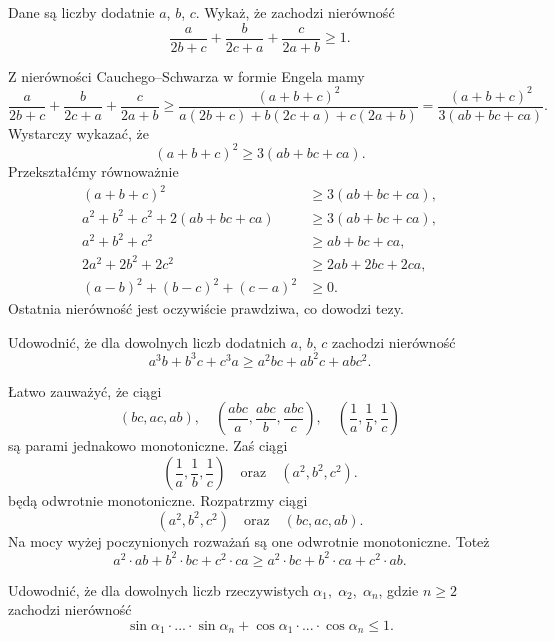 \newpage
{}

\begin{problem}{1}
	Dane są liczby dodatnie $a$, $b$, $c$. Wykaż, że zachodzi nierówność
	\[
		\frac{a}{2b + c} + \frac{b}{2c + a} + \frac{c}{2a + b} \geqslant 1. 
	\]
\end{problem}

\noindent
Z nierówności Cauchego–Schwarza w formie Engela mamy
\[
	\frac{a}{2b + c} + \frac{b}{2c + a} + \frac{c}{2a + b} \geqslant \frac{(a + b + c)^2}{a(2b + c) + b(2c + a) + c(2a + b)} = \frac{(a + b + c)^2}{3(ab + bc + ca)}.
\]
Wystarczy wykazać, że
\[
	(a + b + c)^2 \geqslant 3(ab + bc + ca).
\]
Przekształćmy równoważnie
\begin{align*}
	(a + b + c)^2 &\geqslant 3(ab + bc + ca), \\ 
	a^2 + b^2 + c^2 + 2(ab + bc + ca) &\geqslant 3(ab + bc + ca), \\
	a^2 + b^2 + c^2 &\geqslant ab + bc + ca, \\
	2a^2 + 2b^2 + 2c^2 &\geqslant 2ab + 2bc + 2ca, \\
	(a - b)^2 + (b - c)^2 + (c - a)^2 &\geqslant 0.
\end{align*}
Ostatnia nierówność jest oczywiście prawdziwa, co dowodzi tezy.

\begin{problem}{2}
	Udowodnić, że dla dowolnych liczb dodatnich $a$, $b$, $c$ zachodzi nierówność
	\[
		a^3b + b^3c + c^3a \geqslant a^2bc + ab^2c + abc^2.
	\]
\end{problem}

\noindent
Łatwo zauważyć, że ciągi
\[
	(bc, ac, ab), \quad \left(\frac{abc}{a}, \frac{abc}{b}, \frac{abc}{c}\right), \quad \left(\frac{1}{a}, \frac{1}{b}, \frac{1}{c}\right)
\]
są parami jednakowo monotoniczne. Zaś ciągi
\[
	\left(\frac{1}{a}, \frac{1}{b}, \frac{1}{c}\right) \quad \text{oraz} \quad (a^2, b^2, c^2).
\]
będą odwrotnie monotoniczne.
Rozpatrzmy ciągi
\[
	(a^2, b^2, c^2) \quad \text{oraz} \quad (bc, ac, ab).
\]
Na mocy wyżej poczynionych rozważań są one odwrotnie monotoniczne. Toteż
\[
	a^2 \cdot ab  + b^2 \cdot bc  + c^2 \cdot ca  \geqslant a^2 \cdot bc  + b^2 \cdot ca  + c^2 \cdot ab.
\]

\begin{problem}{3}
	Udowodnić, że dla dowolnych liczb rzeczywistych $\alpha_1, \; \alpha_2, \; \alpha_n$, gdzie $n \geqslant 2$ zachodzi nierówność
	\[
		\sin{\alpha_1}\cdot ... \cdot \sin{\alpha_n} + \cos{\alpha_1}\cdot ... \cdot \cos{\alpha_n} \leqslant 1.
	\]
\end{problem}

